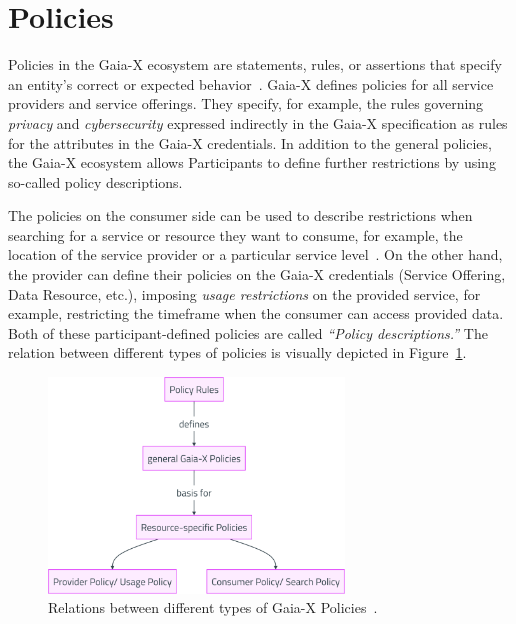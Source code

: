 \section{Policies}\label{sec:policies}

Policies in the Gaia-X ecosystem are statements, rules, or assertions that specify an entity's correct or expected behavior~\cite{gaiax_architecture_document}.
Gaia-X defines policies for all service providers and service offerings.
They specify, for example, the rules governing \textit{privacy} and \textit{cybersecurity} expressed indirectly in the Gaia-X specification as rules for the attributes in the Gaia-X credentials.
In addition to the general policies, the Gaia-X ecosystem allows Participants to define further restrictions by using so-called policy descriptions.

The policies on the consumer side can be used to describe restrictions when searching for a service or resource they want to consume, for example, the location of the service provider or a particular service level~\cite{gaiax_architecture_document}.
On the other hand, the provider can define their policies on the Gaia-X credentials (Service Offering, Data Resource, etc.), imposing \textit{usage restrictions} on the provided service, for example, restricting the timeframe when the consumer can access provided data.
Both of these participant-defined policies are called \textit{``Policy descriptions.''}
The relation between different types of policies is visually depicted in Figure~\ref{fig:gaiax_policies}.

\begin{figure}
    \centering
    \includegraphics[width=0.7\textwidth]{figures/policies.png}
    \caption{Relations between different types of Gaia-X Policies~\cite{gaiax_architecture_document}.}\label{fig:gaiax_policies}
\end{figure}

